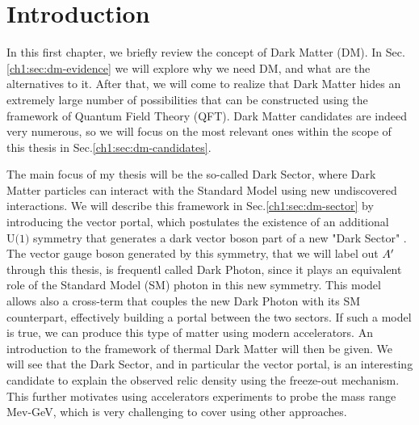 

\newcommand{\pdirone}{chapters/plots/chapter1}


\chapter{Introduction} %

\label{chapter1}

In this first chapter, we briefly review the concept of Dark Matter (DM). In Sec.\ref{ch1:sec:dm-evidence} we will explore why we need DM, and what are the alternatives to it. After that, we will come to realize that Dark Matter hides an extremely large number of possibilities that can be constructed using the framework of Quantum Field Theory (QFT). Dark Matter candidates are indeed very numerous, so we will focus on the most relevant ones within the scope of this thesis in Sec.\ref{ch1:sec:dm-candidates}.

The main focus of my thesis will be the so-called Dark Sector, where Dark Matter particles can interact with the Standard Model using new undiscovered interactions. We will describe this framework in Sec.\ref{ch1:sec:dm-sector}  by introducing the vector portal, which postulates the existence of an additional $\textrm{U(1)}$ symmetry that generates a dark vector boson part of a new "Dark Sector" . The vector gauge boson generated by this symmetry, that we will label out $A'$ through this thesis,  is frequentl called Dark Photon, since it plays an equivalent role of the Standard Model (SM) photon in this new symmetry. This model allows also a cross-term that couples the new Dark Photon with its SM counterpart, effectively building a portal between the two sectors. If such a model is true, we can produce this type of matter using modern accelerators. An introduction to the framework of thermal Dark Matter will then be given. We will see that the Dark Sector, and in particular the vector portal, is an interesting candidate to explain the observed relic density using the freeze-out mechanism. This further motivates using accelerators experiments to probe the mass range Mev-GeV, which is very challenging to cover using other approaches.

